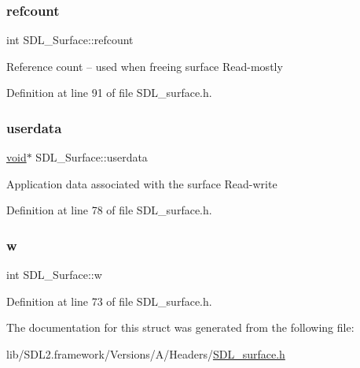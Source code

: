\subsubsection{\texorpdfstring{refcount}{refcount}}
{\footnotesize\ttfamily int S\+D\+L\+\_\+\+Surface\+::refcount}

Reference count -- used when freeing surface Read-\/mostly 

Definition at line 91 of file S\+D\+L\+\_\+surface.\+h.

\mbox{\label{struct_s_d_l___surface_ae66d973dcb9b57cb34815892e1ee1f31}} 
\subsubsection{\texorpdfstring{userdata}{userdata}}
{\footnotesize\ttfamily \mbox{\hyperlink{_s_d_l__opengles2__gl2ext_8h_ae5d8fa23ad07c48bb609509eae494c95}{void}}$\ast$ S\+D\+L\+\_\+\+Surface\+::userdata}

Application data associated with the surface Read-\/write 

Definition at line 78 of file S\+D\+L\+\_\+surface.\+h.

\mbox{\label{struct_s_d_l___surface_a9b0ec7185dcdb2a3530a9160a6ea83d9}} 
\subsubsection{\texorpdfstring{w}{w}}
{\footnotesize\ttfamily int S\+D\+L\+\_\+\+Surface\+::w}



Definition at line 73 of file S\+D\+L\+\_\+surface.\+h.



The documentation for this struct was generated from the following file\+:\begin{DoxyCompactItemize}
\item 
lib/\+S\+D\+L2.\+framework/\+Versions/\+A/\+Headers/\mbox{\hyperlink{_s_d_l__surface_8h}{S\+D\+L\+\_\+surface.\+h}}\end{DoxyCompactItemize}
